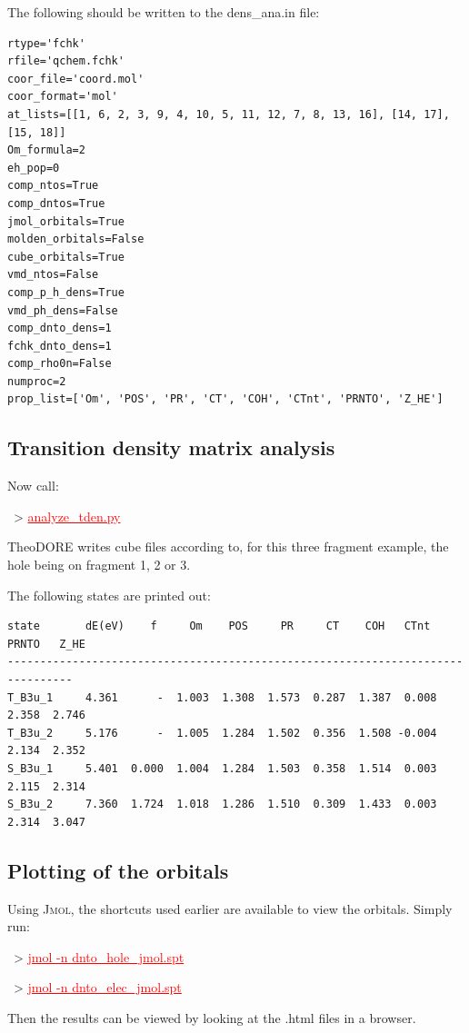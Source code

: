 \documentclass[DIV=12,headings=normal]{scrartcl}
\newcommand{\redl}[1]{{\textcolor{red}{\underline{#1}}}}
\newcommand{\comm}[1]{
\small
~> \redl{#1}
\normalsize
}
\begin{document}
The following should be written to the dens{\_}ana.in file:
\scriptsize
\begin{Verbatim}[commandchars=\\\{\}]
rtype='fchk'
rfile='qchem.fchk'
coor_file='coord.mol'
coor_format='mol'
at_lists=[[1, 6, 2, 3, 9, 4, 10, 5, 11, 12, 7, 8, 13, 16], [14, 17], [15, 18]]
Om_formula=2
eh_pop=0
comp_ntos=True
comp_dntos=True
jmol_orbitals=True
molden_orbitals=False
cube_orbitals=True
vmd_ntos=False
comp_p_h_dens=True
vmd_ph_dens=False
comp_dnto_dens=1
fchk_dnto_dens=1
comp_rho0n=False
numproc=2
prop_list=['Om', 'POS', 'PR', 'CT', 'COH', 'CTnt', 'PRNTO', 'Z_HE']
\end{Verbatim}
\normalsize

\subsection{Transition density matrix analysis}
Now call:
\comm{analyze\_tden.py}

TheoDORE writes cube files according to, for this three fragment example, the hole being on fragment 1, 2 or 3.

The following states are printed out:

\scriptsize
\begin{Verbatim}[commandchars=\\\{\}]
state       dE(eV)    f     Om    POS     PR     CT    COH   CTnt  PRNTO   Z_HE
--------------------------------------------------------------------------------
T_B3u_1     4.361      -  1.003  1.308  1.573  0.287  1.387  0.008  2.358  2.746
T_B3u_2     5.176      -  1.005  1.284  1.502  0.356  1.508 -0.004  2.134  2.352
S_B3u_1     5.401  0.000  1.004  1.284  1.503  0.358  1.514  0.003  2.115  2.314
S_B3u_2     7.360  1.724  1.018  1.286  1.510  0.309  1.433  0.003  2.314  3.047
\end{Verbatim}
\normalsize

\subsection{Plotting of the orbitals}
Using \textsc{Jmol}, the shortcuts used earlier are available to view the orbitals. Simply run:

\comm{jmol -n dnto\_hole\_jmol.spt}
\comm{jmol -n dnto\_elec\_jmol.spt}

Then the results can be viewed by looking at the .html files in a browser.
\end{document}
